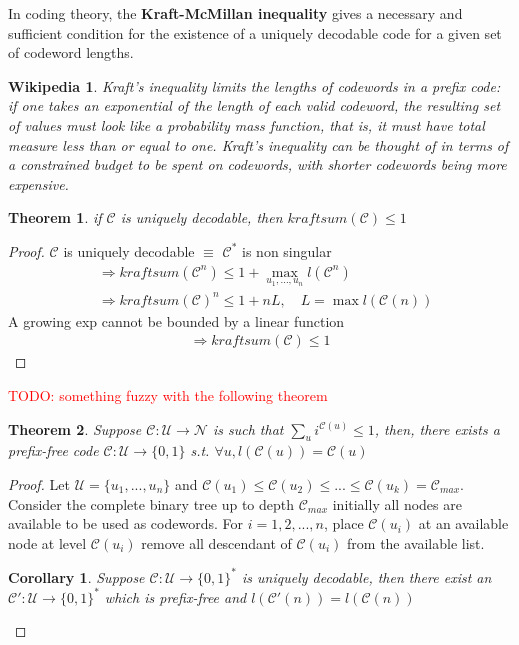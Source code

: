 \documentclass{article}
\newtheorem{theorem}{Theorem}[section]
\newtheorem{corollary}{Corollary}[theorem]
\newtheorem*{wikipedia}{Wikipedia}
\theoremstyle{definition} %
\newcommand{\todo}[1]{\textcolor{red}{TODO: #1}}
\def\U{\mathcal{U}}
\def\N{\mathcal{N}}
\def\C{\mathscr{C}}
\begin{document}
In coding theory, the \textbf{Kraft-McMillan inequality} gives a necessary and sufficient condition for the existence of a uniquely decodable code for a given set of codeword lengths.

\begin{wikipedia}
  Kraft's inequality limits the lengths of codewords in a prefix code: if one takes an exponential of the length of each valid codeword, the resulting set of values must look like a probability mass function, that is, it must have total measure less than or equal to one. Kraft's inequality can be thought of in terms of a constrained budget to be spent on codewords, with shorter codewords being more expensive.
\end{wikipedia}

\begin{theorem}
  if $\C$ is uniquely decodable, then $kraftsum(\C) \leq 1$
\end{theorem}

\begin{proof}
  $\C$ is uniquely decodable $\equiv$ $\C^*$ is non singular
  \begin{align*}
    &\Rightarrow kraftsum(\C^n) \leq 1 + \max _{u_1, ..., u_n} l(\C^n) \\
    &\Rightarrow kraftsum(\C)^n \leq 1 + n L, \quad L = \max l(\C(n))
  \end{align*}
  A growing exp cannot be bounded by a linear function
  \begin{align*}
    \Rightarrow kraftsum(\C) \leq 1
  \end{align*}
\end{proof}

\todo{something fuzzy with the following theorem}

\begin{theorem}
  Suppose $\C : \U \rightarrow \N$ is such that $\sum_u i^{\C(u)} \leq 1$, then, there exists a prefix-free code $\C: \U \rightarrow \{0, 1\}$ s.t. $\forall u, l(\C(u)) = \C(u)$
\end{theorem}

\begin{proof}
  Let $\U = \{u_1, ..., u_n\}$ and $\C(u_1) \leq \C(u_2) \leq ... \leq \C(u_k) = \C_{max}$.
  Consider the complete binary tree up to depth $\C_{max}$ initially all nodes are available to be used as codewords.
  For $i = 1, 2, ..., n$, place $\C(u_i)$ at an available node at level $\C(u_i)$ remove all descendant of $\C(u_i)$ from the available list.

  \begin{corollary}
    Suppose $\C: \U \rightarrow \{0, 1\}^*$ is uniquely decodable, then there exist an $\C': \U \rightarrow \{0, 1\}^*$ which is prefix-free and $l(\C'(n)) = l(\C(n))$
  \end{corollary}
\end{proof}
\end{document}
